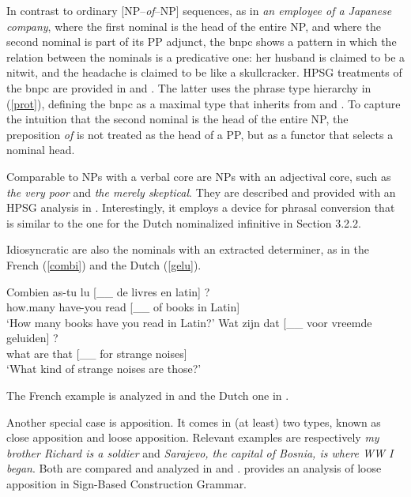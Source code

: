 \documentclass[output=paper]{langsci/langscibook}
\begin{document}
\noindent
In contrast to ordinary [NP--\emph{of}--NP] sequences, 
as in \emph{an employee of a Japanese company}, where the 
first nominal is the head of the entire NP, and where the second 
nominal is part of its PP adjunct, the {\sc bnpc} shows a pattern
in which the relation between the nominals is a predicative one: 
her husband is claimed to be a nitwit, and the headache is claimed to be 
like a skullcracker. HPSG treatments of the {\sc bnpc} are provided in
\citet{KimSells14} and \citet{VanEynde18}. The latter uses 
the phrase type hierarchy in (\ref{prot}), defining the {\sc bnpc} as 
a maximal type that inherits from  and 
. To capture the intuition that the second
nominal is the head of the entire NP, the preposition \emph{of} is 
not treated as the head of a PP, but as a functor that selects 
a nominal head. 

Comparable to NPs with a verbal core are NPs with an adjectival core,
such as \emph{the very poor} and \emph{the merely skeptical}. They are  
described and provided with an HPSG analysis in \citet{ArnoldSpencer2015}.
Interestingly, it employs a device for phrasal conversion that is similar to 
the one for the Dutch nominalized infinitive in Section 3.2.2. 

Idiosyncratic are also the nominals with an extracted determiner, as in 
the French (\ref{combi}) and the Dutch (\ref{gelu}). 

\begin{exe} 
\ex\label{combi}  
\gll   Combien as-tu lu [\_\_ de livres en latin] ?    \\
       how.many have-you read [\_\_ of books in Latin] \\ 
\trans `How many books have you read in Latin?' 
\ex\label{gelu}
\gll   Wat zijn dat [\_\_ voor vreemde geluiden] ? \\
       what are that [\_\_ for strange noises]     \\ 
\trans `What kind of strange noises are those?'  
\end{exe} 

\noindent
The French example is analyzed in \citet[20--21]{Abeilleetal04} and the Dutch one in 
\citet[47--50]{VanEynde04}. 

Another special case is apposition. It comes in (at least) two types, known as 
close apposition and loose apposition. Relevant examples are respectively 
\emph{my brother Richard is a soldier} and \emph{Sarajevo, the capital of Bosnia, is where WW I began}.
Both are compared and analyzed in \citet{Kim12} and \citet{Kim14}. 
\citet{VanEyndeKim16} provides an analysis of loose apposition in
Sign-Based Construction Grammar. 
\end{document}
